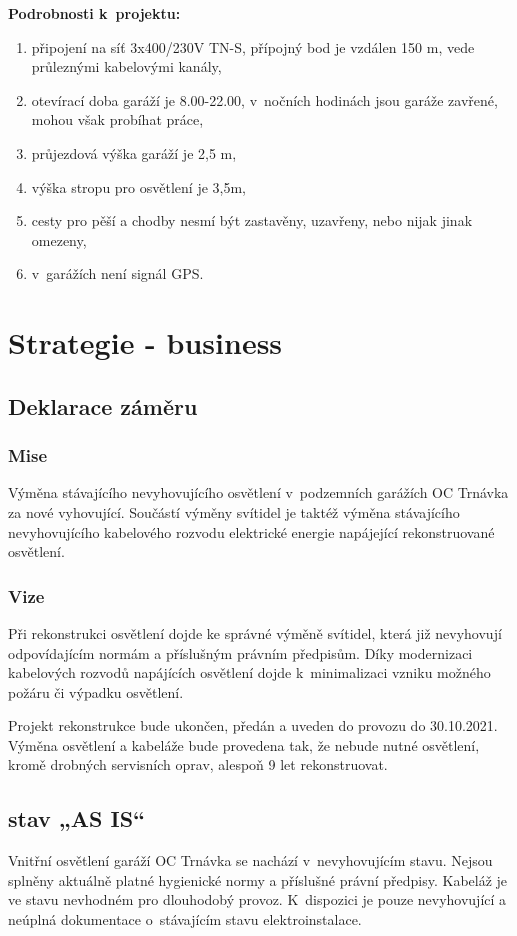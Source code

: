 \documentclass[a4paper, twoside, 11pt]{article}
\begin{document}
			\noindent \textbf{Podrobnosti k~projektu:}
				\begin{enumerate}
					\item připojení na síť 3x400/230V TN-S, přípojný bod je vzdálen 150 m, vede průleznými kabelovými kanály,
					\item otevírací doba garáží je 8.00-22.00, v~nočních hodinách jsou garáže zavřené, mohou však probíhat práce,
					\item průjezdová výška garáží je 2,5 m,
					\item výška stropu pro osvětlení je 3,5m,
					\item cesty pro pěší a chodby nesmí být zastavěny, uzavřeny, nebo nijak jinak omezeny,
					\item v~garážích není signál GPS.
				\end{enumerate}
\section{Strategie - business}
	\subsection{Deklarace záměru}
		\subsubsection{Mise}
		Výměna stávajícího nevyhovujícího osvětlení v~podzemních garážích OC Trnávka za nové vyhovující. Součástí výměny svítidel je taktéž výměna stávajícího nevyhovujícího kabelového rozvodu elektrické energie napájející rekonstruované osvětlení.
		\subsubsection{Vize}
		Při rekonstrukci osvětlení dojde ke správné výměně svítidel, která již nevyhovují odpovídajícím normám a příslušným právním předpisům. Díky modernizaci kabelových rozvodů napájících osvětlení dojde k~minimalizaci vzniku možného požáru či výpadku osvětlení.\par
		Projekt rekonstrukce bude ukončen, předán a uveden do provozu do 30.10.2021. Výměna osvětlení a kabeláže bude provedena tak, že nebude nutné osvětlení, kromě drobných servisních oprav, alespoň 9 let rekonstruovat.
		
	\subsection{stav „AS IS“}
		Vnitřní osvětlení garáží OC Trnávka se nachází v~nevyhovujícím stavu. Nejsou splněny aktuálně platné hygienické normy a příslušné právní předpisy. Kabeláž je ve stavu nevhodném pro dlouhodobý provoz. K~dispozici je pouze nevyhovující a neúplná dokumentace o~stávajícím stavu elektroinstalace.
\end{document}
